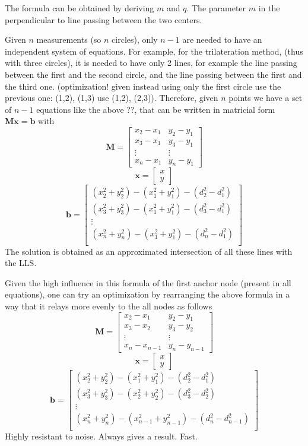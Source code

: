 \documentclass[12pt]{report}
\begin{document}
The formula can be obtained by deriving $m$ and $q$. The parameter $m$ in the perpendicular to line passing between the two centers.

Given $n$ measurements (so $n$ circles), only $n-1$ are needed to have an independent system of equations. For example, for the trilateration method, (thus with three circles), it is needed to have only 2 lines, for example the line passing between the first and the second circle, and the line passing between the first and the third one. (optimization! given instead using only the first circle use the previous one: (1,2), (1,3) use (1,2), (2,3)).
Therefore, given $n$ points we have a set of $n-1$ equations like the above ??, that can be written in matricial form $\mathbf{Mx}=\mathbf{b}$ with
$$\mathbf{M}=\begin{bmatrix}
x_2-x_1&y_2-y_1\\
x_3-x_1&y_3-y_1\\
\vdots&\vdots\\
x_n-x_1&y_n-y_1
\end{bmatrix}$$
$$\mathbf{x}=\begin{bmatrix}
x\\
y
\end{bmatrix}$$
$$\mathbf{b}=\begin{bmatrix}
(x^2_2+y^2_2)-(x_1^2+y^2_1)-(d_2^2-d_1^2)\\
(x^2_3+y^2_3)-(x_1^2+y^2_1)-(d_3^2-d_1^2)\\
\vdots\\
(x^2_n+y^2_n)-(x_1^2+y^2_1)-(d_n^2-d_1^2)\\
\end{bmatrix}$$
The solution is obtained as an approximated intersection of all these lines with the LLS.

Given the high influence in this formula of the first anchor node (present in all equations), one can try an optimization by rearranging the above formula in a way that it relays more evenly to the all nodes as follows
$$\mathbf{M}=\begin{bmatrix}
x_2-x_1&y_2-y_1\\
x_3-x_2&y_3-y_2\\
\vdots&\vdots\\
x_n-x_{n-1}&y_n-y_{n-1}
\end{bmatrix}$$
$$\mathbf{x}=\begin{bmatrix}
x\\
y
\end{bmatrix}$$
$$\mathbf{b}=\begin{bmatrix}
(x^2_2+y^2_2)-(x_1^2+y^2_1)-(d_2^2-d_1^2)\\
(x^2_3+y^2_3)-(x_2^2+y^2_2)-(d_3^2-d_2^2)\\
\vdots\\
(x^2_n+y^2_n)-(x_{n-1}^2+y^2_{n-1})-(d_n^2-d_{n-1}^2)\\
\end{bmatrix}$$
Highly resistant to noise. Always gives a result. Fast.
\clearpage
\end{document}
